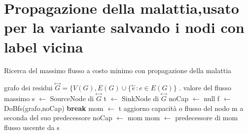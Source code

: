 \documentclass{article}
\begin{document}
\section{Propagazione della malattia,usato per la variante salvando i nodi con label vicina}
\begin{algorithm}
\caption{Ricerca del massimo flusso a costo minimo con propagazione della malattia}
\begin{algorithmic}
\REQUIRE grafo dei residui $\overset{\leftrightarrow}{G} = \{V(G),E(G) \cup \{ \overset{\leftarrow}{e} : e \in E(G) \}$ .
\ENSURE valore del flusso massimo
\STATE s $\leftarrow$ SourceNode di $\overset{\leftrightarrow}{G}$
\STATE t $\leftarrow$ SinkNode di $\overset{\leftrightarrow}{G}$
\STATE noCap $\leftarrow$ null
\LOOP
\STATE f $\leftarrow$ DoBfs(grafo,noCap)
\STATE \textbf{break}
\ENDIF
\STATE mom $\leftarrow$ t
\STATE aggiorno capacità o flusso del nodo m a seconda del suo predecessore
\STATE noCap $\leftarrow$ mom
\ENDIF
\STATE mom $\leftarrow$ predecessore di mom
\ENDWHILE
\ENDLOOP
\RETURN flusso uscente da s
\end{algorithmic}
\end{algorithm}
\end{document}
